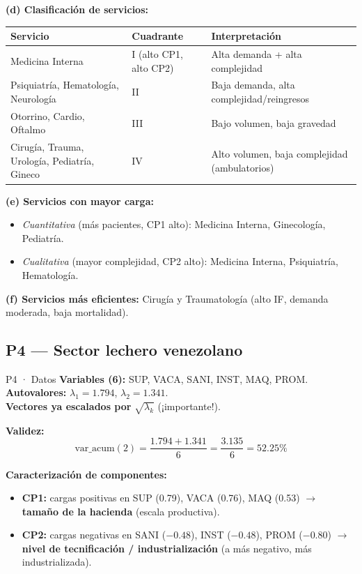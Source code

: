 \documentclass[11pt,a4paper]{article}
\begin{document}
\textbf{(d) Clasificación de servicios:}
\begin{center}\small
\begin{tabular}{llp{6cm}}
\toprule
Servicio & Cuadrante & Interpretación \\
\midrule
Medicina Interna & I (alto CP1, alto CP2) & Alta demanda + alta complejidad \\
Psiquiatría, Hematología, Neurología & II & Baja demanda, alta complejidad/reingresos \\
Otorrino, Cardio, Oftalmo & III & Bajo volumen, baja gravedad \\
Cirugía, Trauma, Urología, Pediatría, Gineco & IV & Alto volumen, baja complejidad (ambulatorios) \\
\bottomrule
\end{tabular}
\end{center}

\textbf{(e) Servicios con mayor carga:}
\begin{itemize}[leftmargin=*]
    \item \emph{Cuantitativa} (más pacientes, CP1 alto): Medicina Interna, Ginecología, Pediatría.
    \item \emph{Cualitativa} (mayor complejidad, CP2 alto): Medicina Interna, Psiquiatría, Hematología.
\end{itemize}

\textbf{(f) Servicios más eficientes:} Cirugía y Traumatología (alto IF, demanda moderada, baja mortalidad).

\hrulefill

\subsection{P4 — Sector lechero venezolano}

\begin{ejerciciobox}{P4 · Datos}
\textbf{Variables (6):} SUP, VACA, SANI, INST, MAQ, PROM.\\
\textbf{Autovalores:} $\lambda_1=1.794$, $\lambda_2=1.341$.\\
\textbf{Vectores ya escalados por} $\sqrt{\lambda_k}$ (¡importante!).
\end{ejerciciobox}

\textbf{Validez:}
\[
\mathrm{var\_acum}(2) = \frac{1.794+1.341}{6} = \frac{3.135}{6} = \boxed{52.25\%}
\]

\textbf{Caracterización de componentes:}
\begin{itemize}[leftmargin=*]
    \item \textbf{CP1:} cargas positivas en SUP (0.79), VACA (0.76), MAQ (0.53) $\to$ \textbf{tamaño de la hacienda} (escala productiva).
    \item \textbf{CP2:} cargas negativas en SANI ($-0.48$), INST ($-0.48$), PROM ($-0.80$) $\to$ \textbf{nivel de tecnificación / industrialización} (a más negativo, más industrializada).
\end{itemize}
\end{document}
